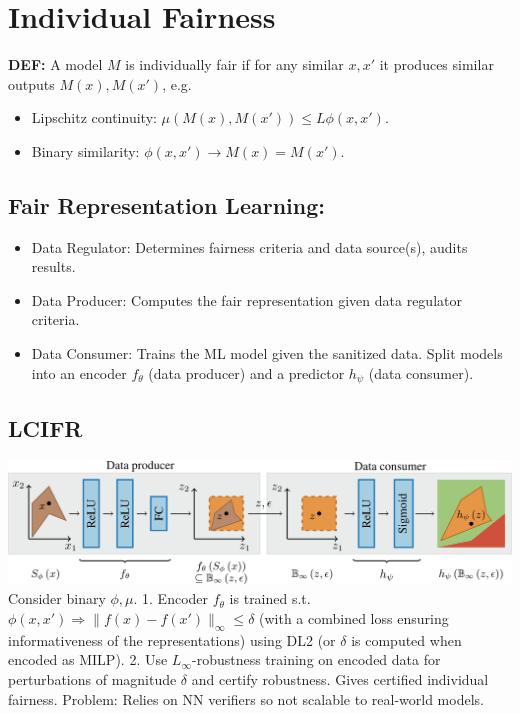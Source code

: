 \section{Individual Fairness}
\textbf{DEF:} A model $M$ is individually fair if for any similar $x,x'$ it produces similar outputs $M(x),M(x')$, e.g.
\begin{itemize}
    \item Lipschitz continuity: $\mu(M(x),M(x'))\le L\phi(x,x')$.
    \item Binary similarity: $\phi(x,x')\rightarrow M(x)=M(x')$.
\end{itemize}

\subsection*{Fair Representation Learning:}
\begin{itemize}
    \item Data Regulator: Determines fairness criteria and data source(s), audits results.
    \item Data Producer: Computes the fair representation given data regulator criteria.
    \item Data Consumer: Trains the ML model given the sanitized data.
          Split models into an encoder $f_\theta$ (data producer) and a predictor $h_\psi$ (data consumer).
\end{itemize}

\subsection*{LCIFR}
\includegraphics[width=1\columnwidth]{img/lcifr.png}
Consider binary $\phi,\mu$. 1. Encoder $f_\theta$ is trained s.t. $\phi(x, x') \Rightarrow \|f(x) - f(x')\|_\infty \leq \delta$ (with a combined loss ensuring informativeness of the representations) using DL2 (or $\delta$ is computed when encoded as MILP). 2. Use $L_\infty$-robustness training on encoded data for perturbations of magnitude $\delta$ and certify robustness. Gives certified individual fairness. Problem: Relies on NN verifiers so not scalable to real-world models.

